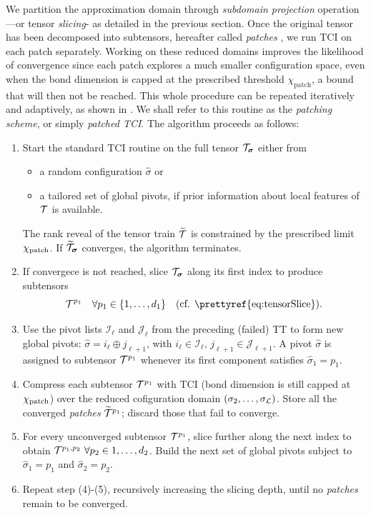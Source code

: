 We partition the approximation domain through \textit{subdomain projection} operation—or tensor \textit{slicing}- as detailed in the previous section. Once the original tensor has been decomposed into subtensors, hereafter called \textit{patches} \footnotemark, we run TCI on each patch separately. Working on these reduced domains improves the likelihood of convergence since each patch explores a much smaller configuration space, even when the bond dimension is capped at the prescribed threshold $\chi_{\text{patch}}$, a bound that will then not be reached.
This whole procedure can be repeated iteratively and adaptively, as shown in . We shall refer to this routine as the \textit{patching scheme}, or simply \textit{patched TCI}.
The algorithm proceeds as follows:
\begingroup
\renewcommand{\labelenumi}{(\arabic{enumi})}
\begin{enumerate}
	\item Start the standard TCI routine on the full tensor $\mathcal{T}_{\boldsymbol{\sigma}}$ either from
	\begin{itemize}
		\item a random configuration $\hat{\sigma}$ or
		\item a tailored set of global pivots, if prior information about local features of $\mathcal{T}$ is available.
	\end{itemize}
	The rank reveal of the tensor train $\widetilde{\mathcal{T}}$ is constrained by the prescribed limit $\chi_{\text{patch}}$. If $\widetilde{\mathcal{T}}_{\boldsymbol{\sigma}}$ converges, the algorithm terminates. 
	\item If convergece is not reached, slice $\mathcal{T}_{\boldsymbol{\sigma}}$ along its first index to produce subtensors 
	$$\mT^{p_1}\quad \forall p_1 \in \{1,\dots,d_1\}\quad \text{(cf. \prettyref{eq:tensorSlice}).}$$
	\item Use the pivot lists $\mathcal{I}_\ell$ and $\mathcal{J}_\ell$ from the preceding (failed) TT to form new global pivots: $\hat{\sigma} = i_\ell \oplus j_{\ell +1}$, with $i_\ell \in \mathcal{I}_\ell$, $j_{\ell+1} \in \mathcal{J}_{\ell +1}$. 
	A pivot $\hat{\sigma}$ is assigned to subtensor $\mathcal{T}^{p_1}$ whenever its first component satisfies $\hat{\sigma}_1 = p_1$.
	\item Compress each subtensor $\mathcal{T}^{p_1}$ with TCI  (bond dimension is still capped at $\chi_{\text{patch}}$) over the reduced cofiguration domain $(\sigma_2, \dots, \sigma_{\mathcal{L}})$.  Store all the converged \textit{patches} $\widetilde{\mathcal{T}}^{p_1}$; discard those that fail to converge. 
	\item For every unconverged subtensor $\mathcal{T}^{p_1}$, slice further along the next index to obtain $\mathcal{T}^{p_1, p_2}\  \forall p_2\in {1,\dots,d_2}$. Build the next set of global pivots subject to $\hat{\sigma}_1 = p_1$ and $\hat{\sigma}_2 = p_2$.
	\item Repeat step (4)-(5), recursively increasing the slicing depth, until no \textit{patches} remain to be converged. 
\end{enumerate}
\endgroup

